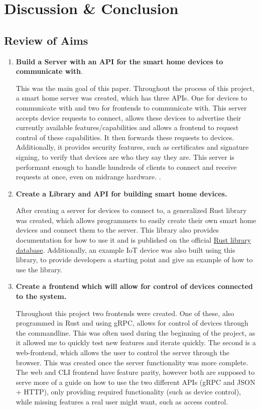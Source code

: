 \chapter{Discussion \& Conclusion} \label{cha:conclusion}
\section{Review of Aims}
\begin{enumerate}
    \item \textbf{Build a Server with an API for the smart home devices to communicate with}. 
    
        This was the main goal of this paper. Throughout the process of this project, a smart home server was created, which has three APIs. One for devices to communicate with and two for frontends to communicate with. This server accepts device requests to connect, allows these devices to advertise their currently available features/capabilities and allows a frontend to request control of these capabilities. It then forwards these requests to devices. Additionally, it provides security features, such as certificates and signature signing, to verify that devices are who they say they are. This server is performant enough to handle hundreds of clients to connect and receive requests at once, even on midrange hardware. .

    \item \textbf{Create a Library and API for building smart home devices.}

        After creating a server for devices to connect to, a generalized Rust library was created, which allows programmers to easily create their own smart home devices and connect them to the server. This library also provides documentation for how to use it and is published on the official \href{https://crates.io/crates/NOSHP-Client}{Rust library database}. Additionally, an example IoT device was also built using this library, to provide developers a starting point and give an example of how to use the library. 

    \item \textbf{Create a frontend which will allow for control of devices connected to the system.}

        Throughout this project two frontends were created. One of these, also programmed in Rust and using gRPC, allows for control of devices through the commandline. This was often used during the beginning of the project, as it allowed me to quickly test new features and iterate quickly. The second is a web-frontend, which allows the user to control the server through the browser. This was created once the server functionality was more complete. The web and CLI frontend have feature parity, however both are supposed to serve more of a guide on how to use the two different APIs (gRPC and JSON + HTTP), only providing required functionality (such as device control), while missing features a real user might want, such as access control.


\end{enumerate}
